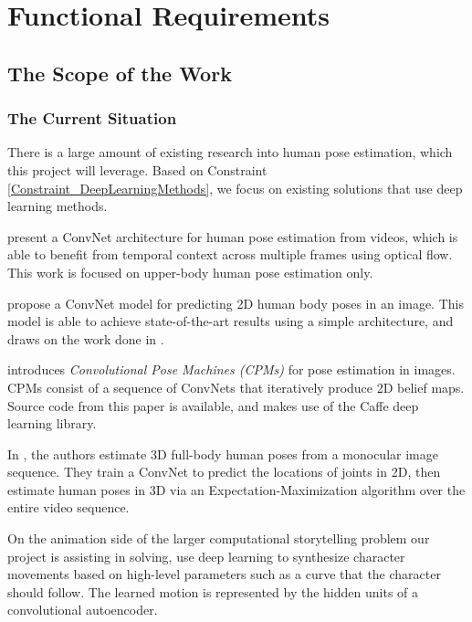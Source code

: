 \documentclass{scrreprt}
\begin{document}
\chapter{Functional Requirements}

\section{The Scope of the Work}

\subsection{The Current Situation}

There is a large amount of existing research into human pose estimation, which
this project will leverage. Based on Constraint
\ref{Constraint_DeepLearningMethods}, we focus on existing solutions that use
deep learning methods.

\cite{DBLP:journals/corr/PfisterCZ15} present a ConvNet architecture for human
pose estimation from videos, which is able to benefit from temporal context
across multiple frames using optical flow. This work is focused on upper-body
human pose estimation only.

\cite{DBLP:journals/corr/BelagiannisZ16} propose a ConvNet model for predicting
2D human body poses in an image. This model is able to achieve state-of-the-art
results using a simple architecture, and draws on the work done in
\cite{DBLP:journals/corr/PfisterCZ15}.

\cite{DBLP:journals/corr/WeiRKS16} introduces \textit{Convolutional Pose
Machines (CPMs)} for pose estimation in images. CPMs consist of a sequence of
ConvNets that iteratively produce 2D belief maps. Source code from this paper
is available, and makes use of the Caffe deep learning library.

In \cite{zhou2016sparseness}, the authors estimate 3D full-body human poses
from a monocular image sequence. They train a ConvNet to predict the locations
of joints in 2D, then estimate human poses in 3D via an
Expectation-Maximization algorithm over the entire video sequence.

On the animation side of the larger computational storytelling problem our
project is assisting in solving, \cite{Holden2016} use
deep learning to synthesize character movements based on high-level parameters
such as a curve that the character should follow. The learned motion is
represented by the hidden units of a convolutional autoencoder.
\end{document}
